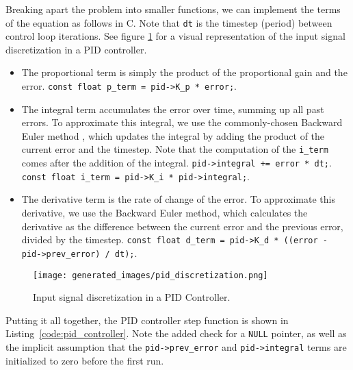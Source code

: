 \documentclass[main.tex]{subfiles}
\begin{document}
\noindent Breaking apart the problem into smaller functions, we can implement the terms of the equation as follows in C. Note that \texttt{dt} is the timestep (period) between control loop iterations. See figure \ref{fig:pid_signal_discretization} for a visual representation of the input signal discretization in a PID controller.
\begin{itemize}
    \item The proportional term is simply the product of the proportional gain and the error. \newline
    \texttt{const float p\_term = pid->K\_p * error;}.
    \item The integral term accumulates the error over time, summing up all past errors. To approximate this integral, we use the commonly-chosen Backward Euler method \cite{AbramovitchPID}, which updates the integral by adding the product of the current error and the timestep. Note that the computation of the \texttt{i\_term} comes after the addition of the integral.
    \texttt{pid->integral += error * dt;}. \newline
    \texttt{const float i\_term = pid->K\_i * pid->integral;}. \newline
    \item The derivative term is the rate of change of the error. To approximate this derivative, we use the Backward Euler method, which calculates the derivative as the difference between the current error and the previous error, divided by the timestep.\newline
    \texttt{const float d\_term = pid->K\_d * ((error - pid->prev\_error) / dt);}.
\end{itemize}

\begin{figure}[H]
    \centering
    \texttt{[image: generated\_images/pid\_discretization.png]}
    \caption{Input signal discretization in a PID Controller.}
    \label{fig:pid_signal_discretization}
\end{figure}

\noindent Putting it all together, the PID controller step function is shown in Listing~\ref{code:pid_controller}. Note the added check for a \texttt{NULL} pointer, as well as the implicit assumption that the \texttt{pid->prev\_error} and \texttt{pid->integral} terms are initialized to zero before the first run.


\end{document}
